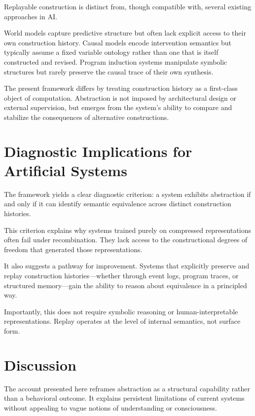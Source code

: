 \documentclass[11pt]{article}
\begin{document}
Replayable construction is distinct from, though compatible with, several existing approaches in AI.

World models capture predictive structure but often lack explicit access to their own construction history. Causal models encode intervention semantics but typically assume a fixed variable ontology rather than one that is itself constructed and revised. Program induction systems manipulate symbolic structures but rarely preserve the causal trace of their own synthesis.

The present framework differs by treating construction history as a first-class object of computation. Abstraction is not imposed by architectural design or external supervision, but emerges from the system's ability to compare and stabilize the consequences of alternative constructions.

\section{Diagnostic Implications for Artificial Systems}

The framework yields a clear diagnostic criterion: a system exhibits abstraction if and only if it can identify semantic equivalence across distinct construction histories.

This criterion explains why systems trained purely on compressed representations often fail under recombination. They lack access to the constructional degrees of freedom that generated those representations.

It also suggests a pathway for improvement. Systems that explicitly preserve and replay construction histories—whether through event logs, program traces, or structured memory—gain the ability to reason about equivalence in a principled way.

Importantly, this does not require symbolic reasoning or human-interpretable representations. Replay operates at the level of internal semantics, not surface form.

\section{Discussion}

The account presented here reframes abstraction as a structural capability rather than a behavioral outcome. It explains persistent limitations of current systems without appealing to vague notions of understanding or consciousness.
\end{document}
